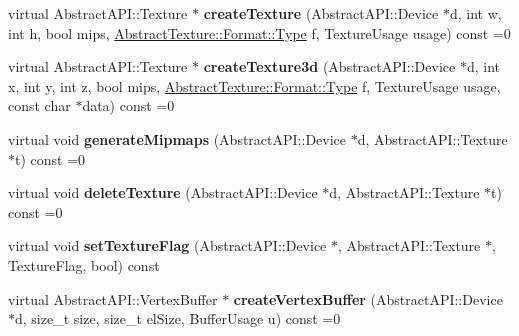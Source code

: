 \begin{DoxyCompactItemize}
\item 
\hypertarget{class_tempest_1_1_abstract_a_p_i_af6d00c14576d566e9e2f80e1db55a75c}{virtual Abstract\+A\+P\+I\+::\+Texture $\ast$ {\bfseries create\+Texture} (Abstract\+A\+P\+I\+::\+Device $\ast$d, int w, int h, bool mips, \hyperlink{struct_tempest_1_1_abstract_texture_1_1_format_a231a1f516e53783bf72c713669b115b3}{Abstract\+Texture\+::\+Format\+::\+Type} f, Texture\+Usage usage) const =0}\label{class_tempest_1_1_abstract_a_p_i_af6d00c14576d566e9e2f80e1db55a75c}

\item 
\hypertarget{class_tempest_1_1_abstract_a_p_i_ab1c23b369fce94a5fb658045336fbc54}{virtual Abstract\+A\+P\+I\+::\+Texture $\ast$ {\bfseries create\+Texture3d} (Abstract\+A\+P\+I\+::\+Device $\ast$d, int x, int y, int z, bool mips, \hyperlink{struct_tempest_1_1_abstract_texture_1_1_format_a231a1f516e53783bf72c713669b115b3}{Abstract\+Texture\+::\+Format\+::\+Type} f, Texture\+Usage usage, const char $\ast$data) const =0}\label{class_tempest_1_1_abstract_a_p_i_ab1c23b369fce94a5fb658045336fbc54}

\item 
\hypertarget{class_tempest_1_1_abstract_a_p_i_ae88b1529a07bcfa94a0d6e250fc5a7c2}{virtual void {\bfseries generate\+Mipmaps} (Abstract\+A\+P\+I\+::\+Device $\ast$d, Abstract\+A\+P\+I\+::\+Texture $\ast$t) const =0}\label{class_tempest_1_1_abstract_a_p_i_ae88b1529a07bcfa94a0d6e250fc5a7c2}

\item 
\hypertarget{class_tempest_1_1_abstract_a_p_i_a21b87fc9351e1d1a245a3dca4ddfdf56}{virtual void {\bfseries delete\+Texture} (Abstract\+A\+P\+I\+::\+Device $\ast$d, Abstract\+A\+P\+I\+::\+Texture $\ast$t) const =0}\label{class_tempest_1_1_abstract_a_p_i_a21b87fc9351e1d1a245a3dca4ddfdf56}

\item 
\hypertarget{class_tempest_1_1_abstract_a_p_i_ad77c4a18ef0b9d404170205a26cc518f}{virtual void {\bfseries set\+Texture\+Flag} (Abstract\+A\+P\+I\+::\+Device $\ast$, Abstract\+A\+P\+I\+::\+Texture $\ast$, Texture\+Flag, bool) const }\label{class_tempest_1_1_abstract_a_p_i_ad77c4a18ef0b9d404170205a26cc518f}

\item 
\hypertarget{class_tempest_1_1_abstract_a_p_i_a8d8f5921ef27bad80d461bec915bf147}{virtual Abstract\+A\+P\+I\+::\+Vertex\+Buffer $\ast$ {\bfseries create\+Vertex\+Buffer} (Abstract\+A\+P\+I\+::\+Device $\ast$d, size\+\_\+t size, size\+\_\+t el\+Size, Buffer\+Usage u) const =0}\label{class_tempest_1_1_abstract_a_p_i_a8d8f5921ef27bad80d461bec915bf147}


\end{DoxyCompactItemize}
